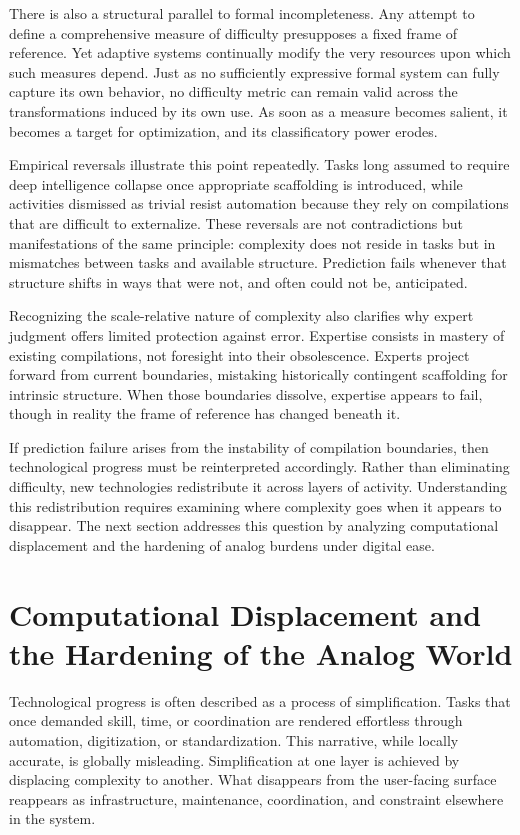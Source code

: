 \documentclass[12pt]{article}
\begin{document}
There is also a structural parallel to formal incompleteness. Any attempt to define a comprehensive measure of difficulty presupposes a fixed frame of reference. Yet adaptive systems continually modify the very resources upon which such measures depend. Just as no sufficiently expressive formal system can fully capture its own behavior, no difficulty metric can remain valid across the transformations induced by its own use. As soon as a measure becomes salient, it becomes a target for optimization, and its classificatory power erodes.

Empirical reversals illustrate this point repeatedly. Tasks long assumed to require deep intelligence collapse once appropriate scaffolding is introduced, while activities dismissed as trivial resist automation because they rely on compilations that are difficult to externalize. These reversals are not contradictions but manifestations of the same principle: complexity does not reside in tasks but in mismatches between tasks and available structure. Prediction fails whenever that structure shifts in ways that were not, and often could not be, anticipated.

Recognizing the scale-relative nature of complexity also clarifies why expert judgment offers limited protection against error. Expertise consists in mastery of existing compilations, not foresight into their obsolescence. Experts project forward from current boundaries, mistaking historically contingent scaffolding for intrinsic structure. When those boundaries dissolve, expertise appears to fail, though in reality the frame of reference has changed beneath it.

If prediction failure arises from the instability of compilation boundaries, then technological progress must be reinterpreted accordingly. Rather than eliminating difficulty, new technologies redistribute it across layers of activity. Understanding this redistribution requires examining where complexity goes when it appears to disappear. The next section addresses this question by analyzing computational displacement and the hardening of analog burdens under digital ease.

\section{Computational Displacement and the Hardening of the Analog World}

Technological progress is often described as a process of simplification. Tasks that once demanded skill, time, or coordination are rendered effortless through automation, digitization, or standardization. This narrative, while locally accurate, is globally misleading. Simplification at one layer is achieved by displacing complexity to another. What disappears from the user-facing surface reappears as infrastructure, maintenance, coordination, and constraint elsewhere in the system.
\end{document}
